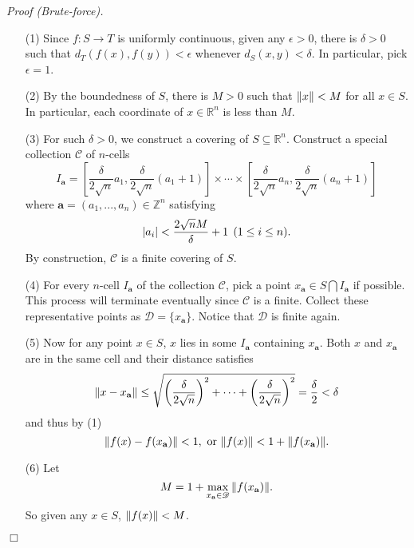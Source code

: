 \documentclass{article}
\begin{document}
\emph{Proof (Brute-force).}
\begin{enumerate}
\item[(1)]
Since $f: S \rightarrow T$ is uniformly continuous,
given any $\epsilon > 0$, there is $\delta > 0$ such that
$d_T(f(x), f(y)) < \epsilon$ whenever $d_S(x, y) < \delta$.
In particular, pick $\epsilon = 1$.
\item[(2)]
By the boundedness of $S$, there is $M > 0$ such that $\norm{x} < M$ for all $x \in S$.
In particular, each coordinate of $x \in \mathbb{R}^n$ is less than $M$.
\item[(3)]
For such $\delta > 0$, we construct a covering of $S \subseteq \mathbb{R}^n$.
Construct a special collection $\mathscr{C}$ of $n$-cells
$$I_{\mathbf{a}} =
  \left[ \frac{\delta}{2\sqrt{n}}a_1, \frac{\delta}{2\sqrt{n}}(a_1+1) \right]
  \times
  \cdots
  \times
  \left[ \frac{\delta}{2\sqrt{n}}a_n, \frac{\delta}{2\sqrt{n}}(a_n+1) \right]
$$
where $\mathbf{a} = (a_1, ..., a_n) \in \mathbb{Z}^n$ satisfying
$$\abs{a_i} < \frac{2\sqrt{n}M}{\delta} + 1 \:\: (1 \leq i \leq n).$$
By construction, $\mathscr{C}$ is a finite covering of $S$.
\item[(4)]
For every $n$-cell $I_{\mathbf{a}}$ of the collection $\mathscr{C}$,
pick a point $x_{\mathbf{a}} \in S \bigcap I_{\mathbf{a}}$ if possible.
This process will terminate eventually since $\mathscr{C}$ is a finite.
Collect these representative points as $\mathscr{D} = \{ x_{\mathbf{a}} \}$.
Notice that $\mathscr{D}$ is finite again.
\item[(5)]
Now for any point $x \in S$, $x$ lies in some $I_{\mathbf{a}}$
containing $x_\mathbf{a}$.
Both $x$ and $x_\mathbf{a}$ are in the same cell and their distance satisfies
$$\norm{x - x_\mathbf{a}}
\leq \sqrt{
\left(\frac{\delta}{2\sqrt{n}}\right)^2 +
\cdots +
\left(\frac{\delta}{2\sqrt{n}}\right)^2}
= \frac{\delta}{2}
< \delta$$
and thus by (1)
$$\norm{f(x) - f(x_\mathbf{a})} < 1,
\text{ or }
\norm{f(x)} <  1 + \norm{f(x_\mathbf{a})}.$$
\item[(6)]
Let
$$M = 1 + \max_{x_\mathbf{a} \in \mathscr{D}} \norm{f(x_\mathbf{a})}.$$
So given any $x \in S$, $\norm{f(x)} < M$.
\end{enumerate}
$\Box$ \\
\end{document}
